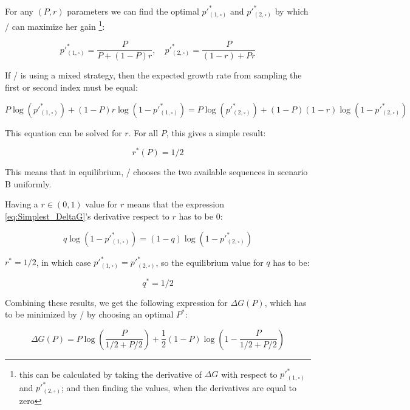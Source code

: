 \documentclass{article}
\newcommand{\wb}{\square}
\theoremstyle{definition}
\begin{document}
For any $(P, r)$ parameters we can find the optimal $p'^*_{(1,\wb)}$ and $p'^*_{(2,\wb)}$ by which \PI/ can maximize her gain \footnote{this can be calculated by taking the derivative of $\Delta G$ with respect to $p'^*_{(1,\wb)}$ and $p'^*_{(2,\wb)}$; and then finding the values, when the derivatives are equal to zero}:

\begin{equation}
    p'^*_{(1,\wb)} = \frac{P}{P+(1-P) r}, \quad  p'^*_{(2,\wb)} = \frac{P}{(1-r)+ P r}
\end{equation}

If \PI/ is using a mixed strategy, then the expected growth rate from sampling the first or second index must be equal:

\begin{equation}
    P \log(p'^*_{(1,\wb)}) + (1-P) r \log(1-p'^*_{(1,\wb)}) =
    P \log(p'^*_{(2,\wb)}) + (1-P) (1-r) \log(1-p'^*_{(2,\wb)})
\end{equation}

This equation can be solved for $r$. For all $P$, this gives a simple result:

\begin{equation}
    r^*(P) = 1/2
\end{equation}

This means that in equilibrium, \PII/ chooses the two available sequences in scenario B uniformly.

Having a $r \in (0,1)$ value for $r$ means that the expression \eqref{eq:Simplest_DeltaG}'s derivative respect to $r$ has to be 0:

\begin{equation}
    q \log(1-p'^*_{(1,\wb)}) = (1-q) \log(1-p'^*_{(2,\wb)})
\end{equation}

$r^*=1/2$, in which case $p'^*_{(1,\wb)} = p'^*_{(2,\wb)}$, so the equilibrium value for $q$ has to be:

\begin{equation}
    q^* = 1/2
\end{equation}

Combining these results, we get the following expression for $\Delta G(P)$, which has to be minimized by \PII/ by choosing an optimal $P^*$:

\begin{equation}
    \Delta G(P) = P \log \left ( \frac{P}{1/2+P/2} \right ) +
    \frac{1}{2} (1-P) \log \left ( 1 - \frac{P}{1/2+P/2} \right )
\end{equation}
\end{document}
